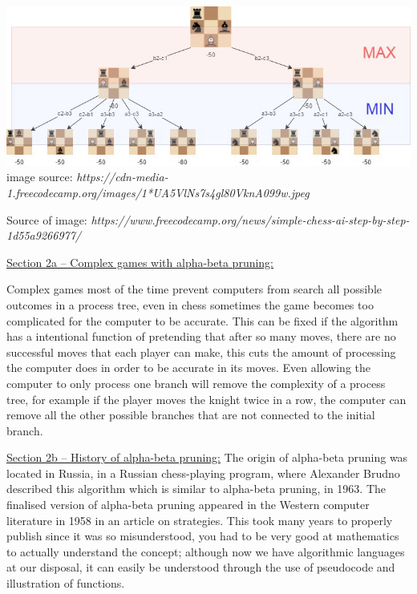 \documentclass{article}
\begin{document}
\includegraphics[scale=0.5]{alpha-beta.jpeg}
image source: \textit{https://cdn-media-1.freecodecamp.org/images/1*UA5VlNs7s4gl80VknA099w.jpeg}

\par Source of image: \textit{https://www.freecodecamp.org/news/simple-chess-ai-step-by-step-1d55a9266977/}


\underline{Section 2a – Complex games with alpha-beta pruning:}

Complex games most of the time prevent computers from search all possible outcomes in a process tree, even in chess sometimes the game becomes too complicated for the computer to be accurate. This can be fixed if the algorithm has a intentional function of pretending that after so many moves, there are no successful moves that each player can make, this cuts the amount of processing the computer does in order to be accurate in its moves. Even allowing the computer to only process one branch will remove the complexity of a process tree, for example if the player moves the knight twice in a row, the computer can remove all the other possible branches that are not connected to the initial branch.

\underline{Section 2b – History of alpha-beta pruning:}
The origin of alpha-beta pruning was located in Russia, in a Russian chess-playing program, where Alexander Brudno described this algorithm which is similar to alpha-beta pruning, in 1963. The finalised version of alpha-beta pruning appeared in the Western computer literature in 1958 in an article on strategies. This took many years to properly publish since it was so misunderstood, you had to be very good at mathematics to actually understand the concept; although now we have algorithmic languages at our disposal, it can easily be understood through the use of pseudocode and illustration of functions.
\end{document}
